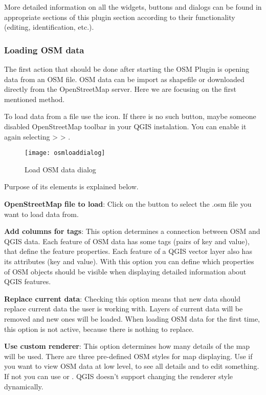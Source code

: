 More detailed information on all the widgets, buttons and dialogs can be
found in appropriate sections of this plugin section according to their 
functionality (editing, identification, etc.).

\subsubsection{Loading OSM data}

The first action that should be done after starting the OSM Plugin is 
opening data from an OSM file. OSM data can be import as shapefile or 
downloaded directly from the OpenStreetMap server. Here we are focusing 
on the first mentioned method.

To load data from a file use the  
icon. If there is no such button, maybe someone disabled OpenStreetMap 
toolbar in your QGIS instalation. You can enable it again selecting
 >  > .

\begin{figure}[ht]
   \begin{center}
   \caption{Load OSM data dialog \nixcaption}\label{fig:osmload}\smallskip
   \texttt{[image: osmloaddialog]}
\end{center}
\end{figure}

Purpose of its elements is explained below.

\begin{description}
\item \textbf{OpenStreetMap file to load}: Click on the button to select 
the .osm file you want to load data from.
\item \textbf{Add columns for tags}: This option determines a connection 
between OSM and QGIS data. Each feature of OSM data has 
some tags (pairs of key and value), that define the feature properties. 
Each feature of a QGIS vector layer also has its attributes (key and value). 
With this option you can define which properties of OSM objects should 
be visible when displaying detailed information about QGIS features.
\item \textbf{Replace current data}: Checking this option means that 
new data should replace current data the user is working with. Layers of 
current data will be removed and new ones will be loaded. When loading 
OSM data for the first time, this option is not active, because there is 
nothing to replace.
\item \textbf{Use custom renderer}: This option determines how many details 
of the map will be used. There are three pre-defined OSM styles for map 
displaying. Use  if you want to view OSM data at low level, 
to see all details and to edit something. If not you can use 
 or . QGIS \CURRENT doesn't 
support changing the renderer style dynamically.
\end{description}

